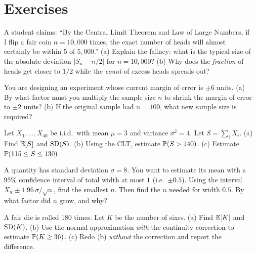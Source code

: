 \section*{Exercises}

\begin{exercise}
\label{ch21:ex-mental-error}
A student claims: ``By the Central Limit Theorem and Law of Large Numbers, if I flip a fair
coin $n = 10{,}000$ times, the exact number of heads will almost certainly be within $5$
of $5{,}000$.'' (a) Explain the fallacy: what is the typical size of the absolute deviation
$|S_n - n/2|$ for $n = 10{,}000$? (b) Why does the \emph{fraction} of heads get closer to
$1/2$ while the \emph{count} of excess heads spreads out?
\end{exercise}

\begin{exercise}
\label{ch21:ex-mental-scale}
You are designing an experiment whose current margin of error is $\pm 6$ units. (a) By what
factor must you multiply the sample size $n$ to shrink the margin of error to $\pm 2$ units?
(b) If the original sample had $n = 100$, what new sample size is required?
\end{exercise}

\begin{exercise}
\label{ch21:ex-standardize}
Let $X_1, \dots, X_{40}$ be i.i.d.\ with mean $\mu = 3$ and variance $\sigma^2 = 4$. Let
$S = \sum_i X_i$. (a) Find $\E[S]$ and $\SD(S)$. (b) Using the CLT, estimate
$\P(S > 140)$. (c) Estimate $\P(115 \le S \le 130)$.
\end{exercise}

\begin{exercise}
\label{ch21:ex-sqrtn}
A quantity has standard deviation $\sigma = 8$. You want to estimate its mean with a
$95\%$ confidence interval of total width at most $1$ (i.e.\ $\pm 0.5$). Using the
interval $\bar X_n \pm 1.96\,\sigma/\sqrt n$, find the smallest $n$. Then find the $n$
needed for width $0.5$. By what factor did $n$ grow, and why?
\end{exercise}

\begin{exercise}
\label{ch21:ex-cc-prob}
A fair die is rolled $180$ times. Let $K$ be the number of sixes. (a) Find $\E[K]$ and
$\SD(K)$. (b) Use the normal approximation \emph{with} the continuity correction to
estimate $\P(K \ge 36)$. (c) Redo (b) \emph{without} the correction and report the
difference.
\end{exercise}

